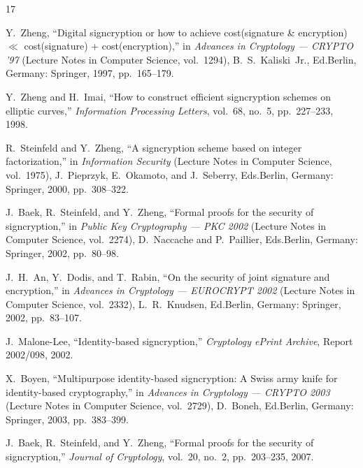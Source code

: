 \documentclass[conference]{IEEEtran}
\begin{document}
\begin{thebibliography}{17}

Y.~Zheng, ``Digital signcryption or how to achieve cost(signature \& encryption) $\ll$ cost(signature) + cost(encryption),'' in \textit{Advances in Cryptology --- CRYPTO '97} (Lecture Notes in Computer Science, vol.~1294), B.~S.~Kaliski~Jr., Ed.\hspace{1em}Berlin, Germany: Springer, 1997, pp.~165--179.

Y.~Zheng and H.~Imai, ``How to construct efficient signcryption schemes on elliptic curves,'' \textit{Information Processing Letters}, vol.~68, no.~5, pp.~227--233, 1998.

R.~Steinfeld and Y.~Zheng, ``A signcryption scheme based on integer factorization,'' in \textit{Information Security} (Lecture Notes in Computer Science, vol.~1975), J.~Pieprzyk, E.~Okamoto, and J.~Seberry, Eds.\hspace{1em}Berlin, Germany: Springer, 2000, pp.~308--322.

J.~Baek, R.~Steinfeld, and Y.~Zheng, ``Formal proofs for the security of signcryption,'' in \textit{Public Key Cryptography --- PKC 2002} (Lecture Notes in Computer Science, vol.~2274), D.~Naccache and P.~Paillier, Eds.\hspace{1em}Berlin, Germany: Springer, 2002, pp.~80--98.

J.~H.~An, Y.~Dodis, and T.~Rabin, ``On the security of joint signature and encryption,'' in \textit{Advances in Cryptology --- EUROCRYPT 2002} (Lecture Notes in Computer Science, vol.~2332), L.~R.~Knudsen, Ed.\hspace{1em}Berlin, Germany: Springer, 2002, pp.~83--107.

J.~Malone-Lee, ``Identity-based signcryption,'' \textit{Cryptology ePrint Archive}, Report 2002/098, 2002.

X.~Boyen, ``Multipurpose identity-based signcryption: A Swiss army knife for identity-based cryptography,'' in \textit{Advances in Cryptology --- CRYPTO 2003} (Lecture Notes in Computer Science, vol.~2729), D.~Boneh, Ed.\hspace{1em}Berlin, Germany: Springer, 2003, pp.~383--399.

J.~Baek, R.~Steinfeld, and Y.~Zheng, ``Formal proofs for the security of signcryption,'' \textit{Journal of Cryptology}, vol.~20, no.~2, pp.~203--235, 2007.


\end{thebibliography}
\end{document}
